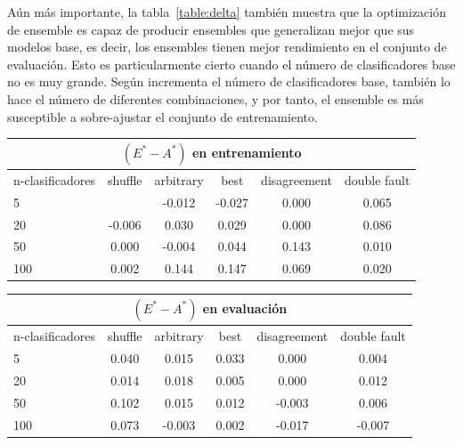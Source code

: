 Aún más importante, la tabla~\ref{table:delta} también muestra que la optimización de ensemble es capaz de producir ensembles que generalizan mejor que sus modelos base, es decir, los ensembles tienen mejor rendimiento en el conjunto de evaluación.
Esto es particularmente cierto cuando el número de clasificadores base no es muy grande. Según incrementa el número de clasificadores base, también lo hace el número de diferentes combinaciones, y por tanto, el ensemble es más susceptible a sobre-ajustar el conjunto de entrenamiento.

\begin{table}[H]
    \centering

    \begin{tabular}{lccccc}
    \toprule
        \multicolumn{6}{c}{$(E^* - A^*)$ en entrenamiento} \\ \midrule
        n-clasificadores & shuffle & arbitrary & best & disagreement & double fault  \\ \midrule \midrule
        5  & \cellcolor{red!25}{-0.076}   & \cellcolor{red!25}-0.012   & \cellcolor{red!25}-0.027   & \cellcolor{yellow!25}0.000   & \cellcolor{green!25}0.065 \\
        20 & \cellcolor{red!25}-0.006  & \cellcolor{green!25}0.030  & \cellcolor{green!25}0.029  & \cellcolor{yellow!25}0.000  & \cellcolor{green!25}0.086 \\
        50 & \cellcolor{yellow!25}0.000  & \cellcolor{red!25}-0.004  & \cellcolor{green!25}0.044  & \cellcolor{green!25}0.143  & \cellcolor{green!25}0.010 \\
        100 & \cellcolor{green!25}0.002  & \cellcolor{green!25}0.144  & \cellcolor{green!25}0.147  & \cellcolor{green!25}0.069  & \cellcolor{green!25}0.020 \\
    \bottomrule
    \end{tabular}

    \begin{tabular}{lccccc}
    \toprule
        \multicolumn{6}{c}{$(E^* - A^*)$ en evaluación} \\ \midrule
        n-clasificadores & shuffle & arbitrary & best & disagreement & double fault  \\ \midrule \midrule
        5  & \cellcolor{green!25}0.040   & \cellcolor{green!25}0.015   & \cellcolor{green!25}0.033   & \cellcolor{yellow!25}0.000   & \cellcolor{green!25}0.004 \\
        20 & \cellcolor{green!25}0.014  & \cellcolor{green!25}0.018  & \cellcolor{green!25}0.005  & \cellcolor{yellow!25}0.000  & \cellcolor{green!25}0.012 \\
        50 & \cellcolor{green!25}0.102  & \cellcolor{green!25}0.015  & \cellcolor{green!25}0.012  & \cellcolor{red!25}-0.003  & \cellcolor{green!25}0.006 \\
        100 & \cellcolor{green!25}0.073  & \cellcolor{red!25}-0.003  & \cellcolor{green!25}0.002  & \cellcolor{red!25}-0.017  & \cellcolor{red!25}-0.007 \\
    \bottomrule
    \end{tabular}


\end{table}
